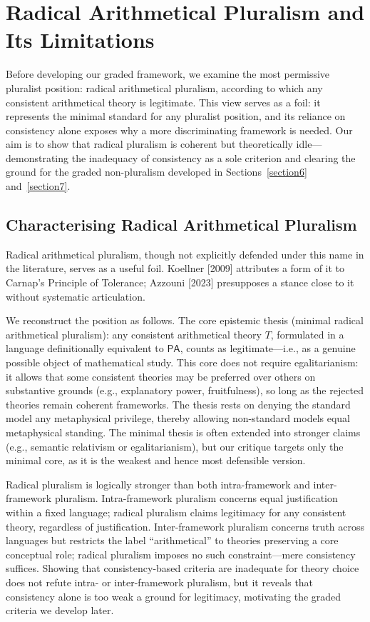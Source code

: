 \documentclass[a4paper,12pt]{amsart}
\theoremstyle{definition}
\numberwithin{equation}{section}
\begin{document}
\section{Radical Arithmetical Pluralism and Its Limitations}\label{section3}

Before developing our graded framework, we examine the most permissive pluralist position: radical arithmetical pluralism, according to which any consistent arithmetical theory is legitimate. This view serves as a foil: it represents the minimal standard for any pluralist position, and its reliance on consistency alone exposes why a more discriminating framework is needed. Our aim is to show that radical pluralism is coherent but theoretically idle—demonstrating the inadequacy of consistency as a sole criterion and clearing the ground for the graded non-pluralism developed in Sections~\ref{section6} and~\ref{section7}. 

\subsection{Characterising Radical Arithmetical Pluralism}

Radical arithmetical pluralism, though not explicitly defended under 
this name in the literature, serves as a useful foil. Koellner [2009] 
attributes a form of it to Carnap's Principle of Tolerance; Azzouni 
[2023] presupposes a stance close to it without systematic 
articulation.

We reconstruct the position as follows. The core epistemic thesis 
(minimal radical arithmetical pluralism): any consistent arithmetical 
theory $T$, formulated in a language definitionally equivalent to \(\mathsf{PA}\), counts as legitimate---i.e., as a genuine possible object of mathematical study. This core does not require egalitarianism: it allows that some consistent theories may be preferred over others on substantive grounds (e.g., explanatory power, fruitfulness), so long as the rejected theories remain coherent frameworks.  The thesis rests on denying the standard model any metaphysical privilege, thereby allowing non-standard models equal metaphysical standing. The minimal thesis is often extended into stronger claims (e.g., semantic relativism or egalitarianism), but our critique targets only the minimal core, as it is the weakest and hence most defensible version.

Radical pluralism is logically stronger than both intra-framework and inter-framework pluralism. Intra-framework pluralism concerns equal justification within a fixed language; radical pluralism claims legitimacy for any consistent theory, regardless of justification. Inter-framework pluralism concerns truth across languages but restricts the label ``arithmetical'' to theories preserving a core conceptual role; radical pluralism imposes no such constraint---mere consistency suffices. Showing that consistency-based criteria are inadequate for theory choice does not refute intra- or inter-framework pluralism, but it reveals that consistency alone is too weak a ground for legitimacy, motivating the graded criteria we develop later.
\end{document}
